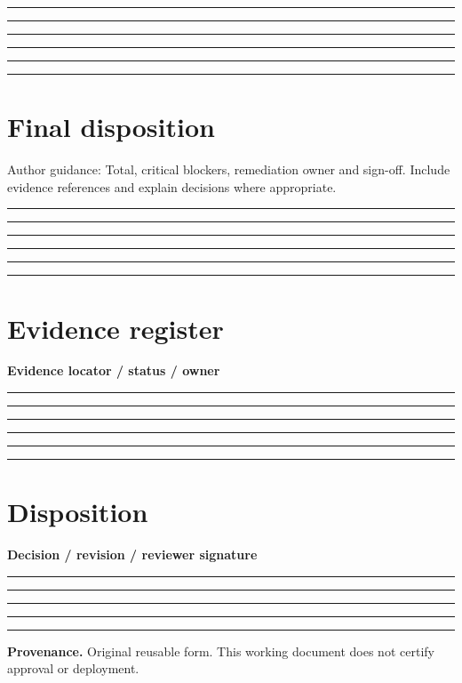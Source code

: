 \documentclass[11pt,letterpaper]{article}
\newcommand{\ResponseLine}{\par\vspace{1.05em}\noindent\rule{\linewidth}{0.4pt}\par}
\newcommand{\ResponseArea}{\ResponseLine\ResponseLine\ResponseLine}
\begin{document}
\ResponseArea\ResponseArea
\section{Final disposition}
Author guidance: Total, critical blockers, remediation owner and sign-off. Include evidence references and explain decisions where appropriate.


\ResponseArea\ResponseArea
\section{Evidence register}
\textbf{Evidence locator / status / owner}\ResponseArea\ResponseArea
\section{Disposition}
\textbf{Decision / revision / reviewer signature}\ResponseArea\ResponseLine
\vfill
\hrule
{\footnotesize\textbf{Provenance.} Original reusable form. This working document does not certify approval or deployment.}
\end{document}
